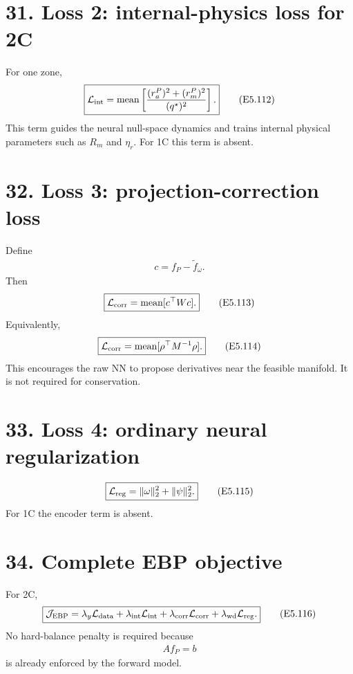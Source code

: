 \documentclass[11pt]{article}
\begin{document}
\section*{31. Loss 2: internal-physics loss for 2C}

For one zone,
\begin{align}
\boxed{\mathcal L_{\rm int}=\operatorname{mean}\left[\frac{(r_a^P)^2+(r_m^P)^2}{(q^\star)^2}\right].}
\tag{E5.112}
\end{align}
This term guides the neural null-space dynamics and trains internal physical parameters such as \(R_m\) and \(\eta_r\). For 1C this term is absent.

\section*{32. Loss 3: projection-correction loss}

Define
\begin{align}
c=f_P-\widetilde f_\omega.
\end{align}
Then
\begin{align}
\boxed{\mathcal L_{\rm corr}=\operatorname{mean}[c^\top Wc].}
\tag{E5.113}
\end{align}
Equivalently,
\begin{align}
\boxed{\mathcal L_{\rm corr}=\operatorname{mean}[\rho^\top M^{-1}\rho].}
\tag{E5.114}
\end{align}
This encourages the raw NN to propose derivatives near the feasible manifold. It is not required for conservation.

\section*{33. Loss 4: ordinary neural regularization}

\begin{align}
\boxed{\mathcal L_{\rm reg}=\|\omega\|_2^2+\|\psi\|_2^2.}
\tag{E5.115}
\end{align}
For 1C the encoder term is absent.

\section*{34. Complete EBP objective}

For 2C,
\begin{align}
\boxed{\mathcal J_{\rm EBP}=\lambda_y\mathcal L_{\rm data}+\lambda_{\rm int}\mathcal L_{\rm int}+\lambda_{\rm corr}\mathcal L_{\rm corr}+\lambda_{\rm wd}\mathcal L_{\rm reg}.}
\tag{E5.116}
\end{align}
No hard-balance penalty is required because
\begin{align}
\boxed{Af_P=b}
\tag{E5.117}
\end{align}
is already enforced by the forward model.
\end{document}
